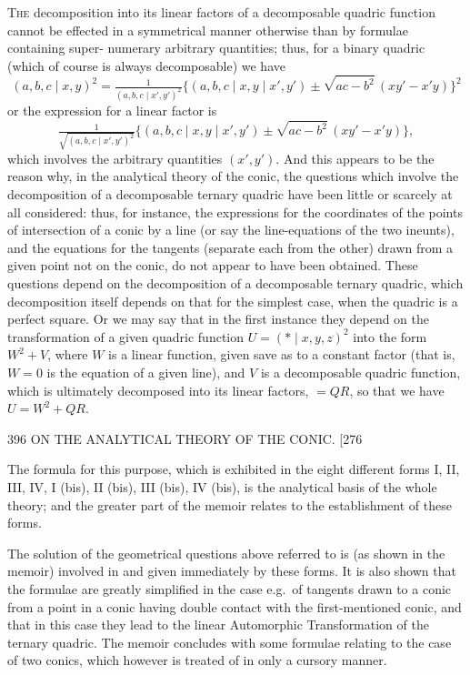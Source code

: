 \documentclass[11pt]{article}
\begin{document}
\textsc{The} decomposition into its linear factors of a decomposable quadric function cannot
be effected in a symmetrical manner otherwise than by formulae containing super-
numerary arbitrary quantities; thus, for a binary quadric (which of course is always
decomposable) we have
\[ (a,b,c \mid x,y)^{2}=\tfrac{1}{(a,b,c \mid x',y')^{2}}\bigl\{(a,b,c \mid x,y\mid x',y')\pm\sqrt{ac-b^{2}}\,(xy'-x'y)\bigr\}^{2} \]
or the expression for a linear factor is
\[ \tfrac{1}{\sqrt{(a,b,c \mid x',y')^{2}}}\bigl\{(a,b,c \mid x,y \mid x',y')\pm\sqrt{ac-b^{2}}\,(xy'-x'y)\bigr\}, \]
which involves the arbitrary quantities $(x',y')$. And this appears to be the reason why,
in the analytical theory of the conic, the questions which involve the decomposition of
a decomposable ternary quadric have been little or scarcely at all considered: thus, for
instance, the expressions for the coordinates of the points of intersection of a conic by a
line (or say the line-equations of the two ineunts), and the equations for the tangents
(separate each from the other) drawn from a given point not on the conic, do not
appear to have been obtained. These questions depend on the decomposition of a
decomposable ternary quadric, which decomposition itself depends on that for the simplest
case, when the quadric is a perfect square. Or we may say that in the first instance
they depend on the transformation of a given quadric function $U=(*\mid x,y,z)^{2}$ into the
form $W^{2}+V$, where $W$ is a linear function, given save as to a constant factor (that is,
$W=0$ is the equation of a given line), and $V$ is a decomposable quadric function, which
is ultimately decomposed into its linear factors, $=QR$, so that we have $U=W^{2}+QR$.

\begin{center}
396 \hfill ON THE ANALYTICAL THEORY OF THE CONIC. \hfill \textsc{[276}
\end{center}

The formula for this purpose, which is exhibited in the eight different forms I, II, III,
IV, I (bis), II (bis), III (bis), IV (bis), is the analytical basis of the whole theory; and
the greater part of the memoir relates to the establishment of these forms.

The solution of the geometrical questions above referred to is (as shown in the
memoir) involved in and given immediately by these forms. It is also shown that the
formulae are greatly simplified in the case e.g.\ of tangents drawn to a conic from a
point in a conic having double contact with the first-mentioned conic, and that in this
case they lead to the linear Automorphic Transformation of the ternary quadric. The
memoir concludes with some formulae relating to the case of two conics, which however
is treated of in only a cursory manner.
\end{document}
